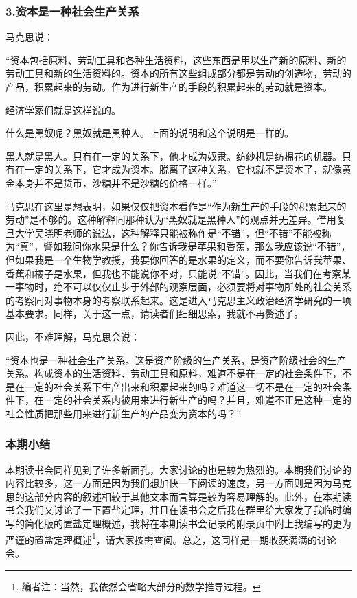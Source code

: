 \documentclass[a4paper,twoside,12pt,AutoFakeBold]{ctexart}
\begin{document}
\subsubsection{3.资本是一种社会生产关系}
马克思说：
\begin{adjustwidth}{2em}{2em}
    \qquad\fangsong
“资本包括原料、劳动工具和各种生活资料，这些东西是用以生产新的原料、新的劳动工具和新的生活资料的。资本的所有这些组成部分都是劳动的创造物，劳动的产品，积累起来的劳动。作为进行新生产的手段的积累起来的劳动就是资本。

经济学家们就是这样说的。

什么是黑奴呢？黑奴就是黑种人。上面的说明和这个说明是一样的。

黑人就是黑人。只有在一定的关系下，他才成为奴隶。纺纱机是纺棉花的机器。只有在一定的关系下，它才成为资本。脱离了这种关系，它也就不是资本了，就像黄金本身并不是货币，沙糖并不是沙糖的价格一样。”
\end{adjustwidth}
马克思在这里是想表明，如果仅仅把资本看作是“作为新生产的手段的积累起来的劳动”是不够的。这种解释同那种认为“黑奴就是黑种人”的观点并无差异。借用复旦大学吴晓明老师的说法，这种解释只能被称作是“不错”，但“不错”不能被称为“真”，譬如我问你水果是什么？你告诉我是苹果和香蕉，那么我应该说“不错”，但如果我是一个生物学教授，我要你回答的是水果的定义，而不要你告诉我苹果、香蕉和橘子是水果，但我也不能说你不对，只能说“不错”。因此，当我们在考察某一事物时，绝不可以仅仅止步于外部的观察层面，必须要将对事物所处的社会关系的考察同对事物本身的考察联系起来。这是进入马克思主义政治经济学研究的一项基本要求。同样，关于这一点，请读者们细细思索，我就不再赘述了。

因此，不难理解，马克思会说：

\begin{adjustwidth}{2em}{2em}
    \qquad\fangsong
    “资本也是一种社会生产关系。这是资产阶级的生产关系，是资产阶级社会的生产关系。构成资本的生活资料、劳动工具和原料，难道不是在一定的社会条件下，不是在一定的社会关系下生产出来和积累起来的吗？难道这一切不是在一定的社会条件下，在一定的社会关系内被用来进行新生产的吗？并且，难道不正是这种一定的社会性质把那些用来进行新生产的产品变为资本的吗？”
\end{adjustwidth}

\subsubsection{本期小结}
本期读书会同样见到了许多新面孔，大家讨论的也是较为热烈的。本期我们讨论的内容比较多，这一方面是因为我们想加快一下阅读的速度，另一方面则是因为马克思的这部分内容的叙述相较于其他文本而言算是较为容易理解的。此外，在本期读书会我们又讨论了一下置盐定理，并且在读书会之后我在群里给大家发了我临时编写的简化版的置盐定理概述，我将在本期读书会记录的附录页中附上我编写的更为严谨的置盐定理概述\footnote{编者注：当然，我依然会省略大部分的数学推导过程。}，请大家按需查阅。总之，这同样是一期收获满满的讨论会。
\end{document}
